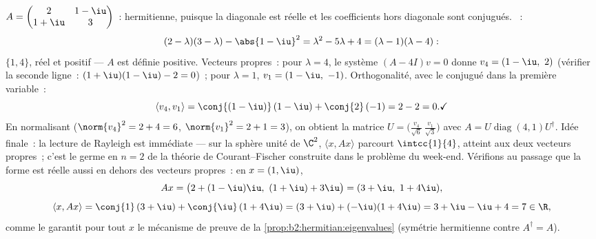 \begin{example}\label{ex:b2:hermitian:pdrun}
$A = \begin{pmatrix} 2 & 1-\iu\\ 1+\iu & 3\end{pmatrix}$~:
hermitienne, puisque la diagonale est réelle et les coefficients hors
diagonale sont conjugués. ~:
\[
(2-\lambda)(3-\lambda) - \abs{1-\iu}^2
= \lambda^2 - 5\lambda + 4
= (\lambda - 1)(\lambda - 4) :
\]
 $\{1, 4\}$, réel et positif --- $A$ est définie
positive. Vecteurs propres~: pour $\lambda = 4$, le système $(A -
4I)v = 0$ donne $v_4 = (1 - \iu,\ 2)$ (vérifier la seconde ligne~:
$(1+\iu)(1-\iu) - 2 = 0$)~; pour $\lambda = 1$, $v_1 = (1 - \iu,\
-1)$. Orthogonalité, avec le conjugué dans la première variable~:
\[
\langle v_4, v_1\rangle
= \conj{(1-\iu)}\,(1-\iu) + \conj{2}\,(-1)
= 2 - 2 = 0 . \checkmark
\]
En normalisant ($\norm{v_4}^2 = 2 + 4 = 6$, $\norm{v_1}^2 = 2 + 1
= 3$), on obtient la matrice  $U = \bigl(\frac{v_4}{\sqrt6}\
\frac{v_1}{\sqrt3}\bigr)$ avec $A =
U\operatorname{diag}(4,1)U^\dagger$. Idée finale~: la lecture de
Rayleigh est immédiate --- sur la sphère unité de
$\C^2$, $\langle x, Ax\rangle$ parcourt $\intcc{1}{4}$,
atteint aux deux vecteurs propres~; c'est le germe en $n = 2$ de la
théorie de Courant--Fischer construite dans le problème du week-end.
Vérifions au passage que la forme est réelle aussi en dehors des
vecteurs propres~: en $x = (1, \iu)$,
\[
Ax = \bigl(2 + (1-\iu)\iu,\ (1+\iu) + 3\iu\bigr)
= (3 + \iu,\ 1 + 4\iu),
\]
\[
\langle x, Ax\rangle = \conj{1}\,(3+\iu) +
\conj{\iu}\,(1+4\iu)
= (3 + \iu) + (-\iu)(1 + 4\iu) = 3 + \iu - \iu + 4 = 7 \in
\R ,
\]
comme le garantit pour tout $x$ le mécanisme de preuve de la
\cref{prop:b2:hermitian:eigenvalues} (symétrie hermitienne contre
$A^\dagger = A$).
\end{example}

